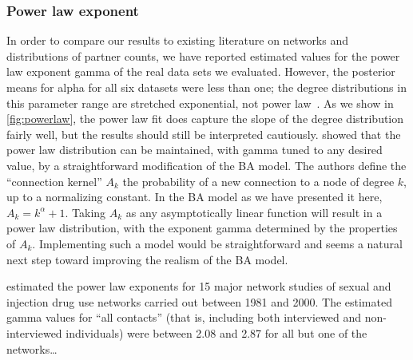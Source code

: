 \subsubsection{Power law exponent}

In order to compare our results to existing literature on networks and
distributions of partner counts, we have reported estimated values for the
power law exponent \gls{gamma} of the real data sets we evaluated. However, the
posterior means for \gls{alpha} for all six datasets were less than one; the
degree distributions in this parameter range are stretched exponential, not
power law~\autocite{krapivsky2000connectivity}. As we show in
\cref{fig:powerlaw}, the power law fit does capture the slope of the degree
distribution fairly well, but the results should still be interpreted
cautiously. \textcite{krapivsky2000connectivity} showed that the power law
distribution can be maintained, with \gls{gamma} tuned to any desired value, by
a straightforward modification of the \gls{BA} model. The authors define the
``connection kernel'' $A_k$ the probability of a new connection to a node of
degree $k$, up to a normalizing constant. In the \gls{BA} model as we have
presented it here, $A_k = k^{\alpha} + 1$. Taking $A_k$ as any asymptotically
linear function will result in a power law distribution, with the exponent
\gls{gamma} determined by the properties of $A_k$. Implementing such a model
would be straightforward and seems a natural next step toward improving the
realism of the \gls{BA} model.

\textcite{rothenberg2007large} estimated the power law exponents for 15 major
network studies of sexual and injection drug use networks carried out between
1981 and 2000. The estimated \gls{gamma} values for ``all contacts'' (that is,
including both interviewed and non-interviewed individuals) were 
between 2.08 and 2.87 for all but one of the networks\ldots



